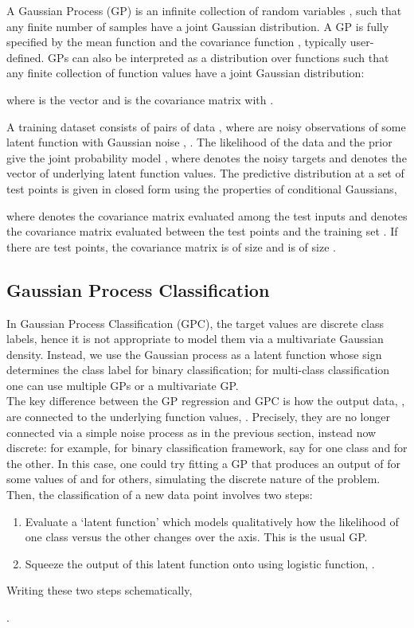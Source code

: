 \documentclass[10pt,letterpaper]{article}
\begin{document}
A Gaussian Process (GP) is an infinite collection of random variables , such that any finite number of samples have a joint Gaussian distribution. A GP is fully specified by the mean function  and the covariance function , typically user-defined. GPs can also be interpreted as a distribution over functions  such that any finite collection of function values  have a joint Gaussian distribution: 

where  is the  vector  and  is the  covariance matrix with . 

A training dataset consists of  pairs of data ,  where  are noisy observations of some latent function  with Gaussian noise , . The likelihood of the data  and the prior  give the joint probability model , where  denotes the noisy targets and  denotes the vector of underlying latent function values. The predictive distribution at a set of test points  is given in closed form using the properties of conditional Gaussians, 

where  denotes the covariance matrix evaluated among the test inputs  and  denotes the covariance matrix evaluated between the test points  and the training set . If there are  test points, the covariance matrix  is of size  and  is of size . 



\subsection{Gaussian Process Classification}
In Gaussian Process Classification (GPC), the target values are discrete class labels, hence it is not appropriate to model them via a multivariate Gaussian density. Instead, we use the Gaussian process as a latent function whose sign determines the class label for binary classification; for multi-class classification one can use multiple GPs or a multivariate GP.\\

The key difference between the GP regression and GPC is how the output data, , are connected to the underlying function
values, .  Precisely, they are no longer connected via a simple noise process as in the previous section, instead now discrete: for example, for binary classification framework, say  for one class and  for the other. In this case, one could try fitting a GP that produces an output of  for some values of  and  for
others, simulating the discrete nature of the problem. Then, the classification of a new data point  involves two steps:
\begin{enumerate}
\item Evaluate a `latent function'  which models qualitatively how the likelihood of one class versus the other
changes over the  axis.  This is the usual GP.
\item Squeeze the output of this latent function onto  using logistic function, .
\end{enumerate}
Writing these two steps schematically,
\begin{center}
  
 .
\end{center}
\end{document}
